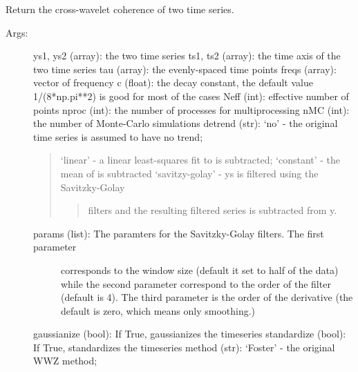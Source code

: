 \documentclass[letterpaper,10pt,english]{sphinxmanual}
\begin{document}

\begin{fulllineitems}
\label{\detokenize{Spectral:pyleoclim.Spectral.xwc}}
Return the cross-wavelet coherence of two time series.
\begin{description}
\item[{Args:}] \leavevmode
ys1, ys2 (array): the two time series
ts1, ts2 (array): the time axis of the two time series
tau (array): the evenly-spaced time points
freqs (array): vector of frequency
c (float): the decay constant, the default value 1/(8*np.pi**2) is good for most of the cases
Neff (int): effective number of points
nproc (int): the number of processes for multiprocessing
nMC (int): the number of Monte-Carlo simulations
detrend (str): ‘no’ - the original time series is assumed to have no trend;
\begin{quote}

‘linear’ - a linear least-squares fit to  is subtracted;
‘constant’ - the mean of  is subtracted
‘savitzy-golay’ - ys is filtered using the Savitzky-Golay
\begin{quote}

filters and the resulting filtered series is subtracted from y.
\end{quote}
\end{quote}
\begin{description}
\item[{params (list): The paramters for the Savitzky-Golay filters. The first parameter}] \leavevmode
corresponds to the window size (default it set to half of the data)
while the second parameter correspond to the order of the filter
(default is 4). The third parameter is the order of the derivative
(the default is zero, which means only smoothing.)

\end{description}

gaussianize (bool): If True, gaussianizes the timeseries
standardize (bool): If True, standardizes the timeseries
method (str): ‘Foster’ - the original WWZ method;
\begin{quote}


\end{quote}
\end{description}
\end{fulllineitems}
\end{document}
